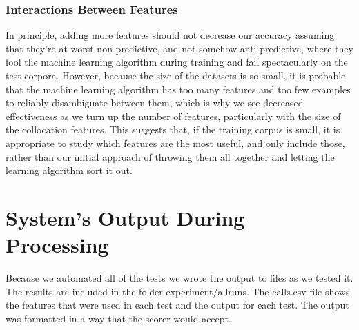 \documentclass{article}
\begin{document}
\subsubsection{Interactions Between Features}

In principle, adding more features should not decrease our accuracy assuming
that they're at worst non-predictive, and not somehow anti-predictive, where
they fool the machine learning algorithm during training and fail spectacularly
on the test corpora.  However, because the size of the datasets is so small, it
is probable that the machine learning algorithm has too many features and too
few examples to reliably disambiguate between them, which is why we see
decreased effectiveness as we turn up the number of features, particularly with
the size of the collocation features.  This suggests that, if the training
corpus is small, it is appropriate to study which features are the most useful,
and only include those, rather than our initial approach of throwing them all
together and letting the learning algorithm sort it out.

\section{System's Output During Processing}

Because we automated all of the tests we wrote the output to files as we tested it.  The results are included in the folder experiment/allruns.  The calls.csv file shows the features that were used in each test and the output for each test.  The output was formatted in a way that the scorer would accept.
\end{document}
